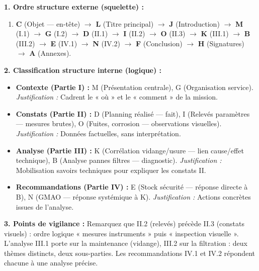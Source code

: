 \documentclass[11pt]{article}
\begin{document}
\begin{corrige}
\textbf{1. Ordre structure externe (squelette) :}
\begin{enumerate}
    \item \textbf{C} (Objet — en-tête) $\rightarrow$ \textbf{L} (Titre principal) $\rightarrow$ \textbf{J} (Introduction) $\rightarrow$ \textbf{M} (I.1) $\rightarrow$ \textbf{G} (I.2) $\rightarrow$ \textbf{D} (II.1) $\rightarrow$ \textbf{I} (II.2) $\rightarrow$ \textbf{O} (II.3) $\rightarrow$ \textbf{K} (III.1) $\rightarrow$ \textbf{B} (III.2) $\rightarrow$ \textbf{E} (IV.1) $\rightarrow$ \textbf{N} (IV.2) $\rightarrow$ \textbf{F} (Conclusion) $\rightarrow$ \textbf{H} (Signatures) $\rightarrow$ \textbf{A} (Annexes).
\end{enumerate}

\textbf{2. Classification structure interne (logique) :}
\begin{itemize}
    \item \textbf{Contexte (Partie I) :} M (Présentation centrale), G (Organisation service). \textit{Justification :} Cadrent le « où » et le « comment » de la mission.
    \item \textbf{Constats (Partie II) :} D (Planning réalisé — fait), I (Relevés paramètres — mesures brutes), O (Fuites, corrosion — observations visuelles). \textit{Justification :} Données factuelles, sans interprétation.
    \item \textbf{Analyse (Partie III) :} K (Corrélation vidange/usure — lien cause/effet technique), B (Analyse pannes filtres — diagnostic). \textit{Justification :} Mobilisation savoirs techniques pour expliquer les constats II.
    \item \textbf{Recommandations (Partie IV) :} E (Stock sécurité — réponse directe à B), N (GMAO — réponse systémique à K). \textit{Justification :} Actions concrètes issues de l'analyse.
\end{itemize}

\textbf{3. Points de vigilance :} Remarquez que II.2 (relevés) précède II.3 (constats visuels) : ordre logique « mesures instruments » puis « inspection visuelle ». L'analyse III.1 porte sur la maintenance (vidange), III.2 sur la filtration : deux thèmes distincts, deux sous-parties. Les recommandations IV.1 et IV.2 répondent chacune à une analyse précise.
\end{corrige}
\end{document}
